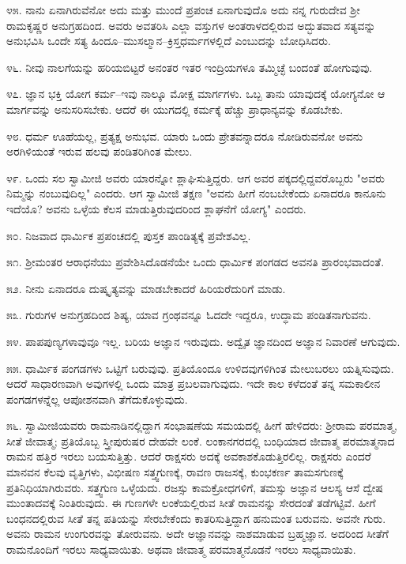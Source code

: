೪೫. ನಾನು ಏನಾಗಿರುವೆನೋ ಅದು ಮತ್ತು ಮುಂದೆ ಪ್ರಪಂಚ ಏನಾಗುವುದೊ ಅದು ನನ್ನ ಗುರುದೇವ ಶ‍್ರೀ ರಾಮಕೃಷ್ಣರ ಅನುಗ್ರಹದಿಂದ. ಅವರು ಅವತರಿಸಿ ಎಲ್ಲಾ ವಸ್ತುಗಳ ಅಂತರಾಳದಲ್ಲಿರುವ ಅದ್ಭುತವಾದ ಸತ್ಯವನ್ನು ಅನುಭವಿಸಿ ಒಂದೇ ಸತ್ಯ ಹಿಂದೂ–ಮುಸಲ್ಮಾನ–ಕ್ರಿಸ್ತಧರ್ಮಗಳಲ್ಲಿದೆ ಎಂಬುದನ್ನು ಬೋಧಿಸಿದರು.

೪೬. ನೀವು ನಾಲಗೆಯನ್ನು ಹರಿಯಬಿಟ್ಟರೆ ಅನಂತರ ಇತರ ಇಂದ್ರಿಯಗಳೂ ತಮ್ಮಿಚ್ಛೆ ಬಂದಂತೆ ಹೋಗುವುವು.

೪೭. ಜ್ಞಾನ ಭಕ್ತಿ ಯೋಗ ಕರ್ಮ–ಇವು ನಾಲ್ಕೂ ಮೋಕ್ಷ ಮಾರ್ಗಗಳು. ಒಬ್ಬ ತಾನು ಯಾವುದಕ್ಕೆ ಯೋಗ್ಯನೋ ಆ ಮಾರ್ಗವನ್ನು ಅನುಸರಿಸಬೇಕು. ಆದರೆ ಈ ಯುಗದಲ್ಲಿ ಕರ್ಮಕ್ಕೆ ಹೆಚ್ಚು ಪ್ರಾಧಾನ್ಯವನ್ನು ಕೊಡಬೇಕು.

೪೮. ಧರ್ಮ ಊಹೆಯಲ್ಲ, ಪ್ರತ್ಯಕ್ಷ ಅನುಭವ. ಯಾರು ಒಂದು ಪ್ರೇತವನ್ನಾದರೂ ನೋಡಿರುವನೋ ಅವನು ಅರಗಿಳಿಯಂತೆ ಇರುವ ಹಲವು ಪಂಡಿತರಿಗಿಂತ ಮೇಲು.

೪೯. ಒಂದು ಸಲ ಸ್ವಾಮೀಜಿ ಅವರು ಯಾರನ್ನೋ ಶ್ಲಾಘಿಸುತ್ತಿದ್ದರು. ಆಗ ಅವರ ಪಕ್ಕದಲ್ಲಿದ್ದವರೊಬ್ಬರು "ಅವರು ನಿಮ್ಮನ್ನು ನಂಬುವುದಿಲ್ಲ" ಎಂದರು. ಆಗ ಸ್ವಾಮೀಜಿ ತಕ್ಷಣ "ಅವನು ಹೀಗೆ ನಂಬಬೇಕೆಂದು ಏನಾದರೂ ಕಾನೂನು ಇದೆಯೊ? ಅವನು ಒಳ್ಳೆಯ ಕೆಲಸ ಮಾಡುತ್ತಿರುವುದರಿಂದ ಶ್ಲಾಘನೆಗೆ ಯೋಗ್ಯ" ಎಂದರು.

೫೦. ನಿಜವಾದ ಧಾರ್ಮಿಕ ಪ್ರಪಂಚದಲ್ಲಿ ಪುಸ್ತಕ ಪಾಂಡಿತ್ಯಕ್ಕೆ ಪ್ರವೇಶವಿಲ್ಲ.

೫೧. ಶ‍್ರೀಮಂತರ ಆರಾಧನೆಯು ಪ್ರವೇಶಿಸಿದೊಡನೆಯೇ ಒಂದು ಧಾರ್ಮಿಕ ಪಂಗಡದ ಅವನತಿ ಪ್ರಾರಂಭವಾದಂತೆ.

೫೨. ನೀನು ಏನಾದರೂ ದುಷ್ಕೃತ್ಯವನ್ನು ಮಾಡಬೇಕಾದರೆ ಹಿರಿಯರೆದುರಿಗೆ ಮಾಡು.

೫೩. ಗುರುಗಳ ಅನುಗ್ರಹದಿಂದ ಶಿಷ್ಯ, ಯಾವ ಗ್ರಂಥವನ್ನೂ ಓದದೇ ಇದ್ದರೂ, ಉದ್ಧಾಮ ಪಂಡಿತನಾಗುವನು.

೫೪. ಪಾಪಪುಣ್ಯಗಳಾವುವೂ ಇಲ್ಲ. ಬರಿಯ ಅಜ್ಞಾನ ಇರುವುದು. ಅದ್ವೈತ ಜ್ಞಾನದಿಂದ ಅಜ್ಞಾನ ನಿವಾರಣೆ ಆಗುವುದು.

೫೫. ಧಾರ್ಮಿಕ ಪಂಗಡಗಳು ಒಟ್ಟಿಗೆ ಬರುವುವು. ಪ್ರತಿಯೊಂದೂ ಉಳಿದವುಗಳಿಗಿಂತ ಮೇಲುಬರಲು ಯತ್ನಿಸುವುದು. ಆದರೆ ಸಾಧಾರಣವಾಗಿ ಅವುಗಳಲ್ಲಿ ಒಂದು ಮಾತ್ರ ಪ್ರಬಲವಾಗುವುದು. ಇದೇ ಕಾಲ ಕಳೆದಂತೆ ತನ್ನ ಸಮಕಾಲೀನ ಪಂಗಡಗಳನ್ನೆಲ್ಲ ಆಪೋಶನವಾಗಿ ತೆಗೆದುಕೊಳ್ಳುವುದು.

೫೬. ಸ್ವಾಮೀಜಿಯವರು ರಾಮನಾಡಿನಲ್ಲಿದ್ದಾಗ ಸಂಭಾಷಣೆಯ ಸಮಯದಲ್ಲಿ ಹೀಗೆ ಹೇಳಿದರು: ಶ‍್ರೀರಾಮ ಪರಮಾತ್ಮ, ಸೀತೆ ಜೀವಾತ್ಮ; ಪ್ರತಿಯೊಬ್ಬ ಸ್ತ್ರೀಪುರುಷರ ದೇಹವೇ ಲಂಕೆ. ಲಂಕಾನಗರದಲ್ಲಿ ಬಂಧಿಯಾದ ಜೀವಾತ್ಮ ಪರಮಾತ್ಮನಾದ ರಾಮನ ಹತ್ತಿರ ಇರಲು ಬಯಸುತ್ತಿತ್ತು. ಆದರೆ ರಾಕ್ಷಸರು ಅದಕ್ಕೆ ಅವಕಾಶಕೊಡುತ್ತಿರಲಿಲ್ಲ. ರಾಕ್ಷಸರು ಎಂದರೆ ಮಾನವನ ಕೆಲವು ವೃತ್ತಿಗಳು, ವಿಭೀಷಣ ಸತ್ತ್ವಗುಣಕ್ಕೆ, ರಾವಣ ರಾಜಸಕ್ಕೆ, ಕುಂಭಕರ್ಣ ತಾಮಸಗುಣಕ್ಕೆ ಪ್ರತಿನಿಧಿಯಾಗಿರುವರು. ಸತ್ತ್ವಗುಣ ಒಳ್ಳೆಯದು. ರಜಸ್ಸು ಕಾಮಕ್ರೋಧಗಳಿಗೆ, ತಮಸ್ಸು ಅಜ್ಞಾನ ಆಲಸ್ಯ ಆಸೆ ದ್ವೇಷ ಮುಂತಾದವಕ್ಕೆ ನಿಂತಿರುವುದು. ಈ ಗುಣಗಳೇ ಲಂಕೆಯಲ್ಲಿರುವ ಸೀತೆ ರಾಮನನ್ನು ಸೇರದಂತೆ ತಡೆಗಟ್ಟಿವೆ. ಹೀಗೆ ಬಂಧನದಲ್ಲಿರುವ ಸೀತೆ ತನ್ನ ಪತಿಯನ್ನು ಸೇರಬೇಕೆಂದು ಕಾತರಿಸುತ್ತಿದ್ದಾಗ ಹನುಮಂತ ಬರುವನು. ಅವನೇ ಗುರು. ಅವನು ರಾಮನ ಉಂಗುರವನ್ನು ತೋರುವನು. ಅದೇ ಅಜ್ಞಾನವನ್ನು ನಾಶಮಾಡುವ ಬ್ರಹ್ಮಜ್ಞಾನ. ಅದರಿಂದ ಸೀತೆಗೆ ರಾಮನೊಂದಿಗೆ ಇರಲು ಸಾಧ್ಯವಾಯಿತು. ಅಥವಾ ಜೀವಾತ್ಮ ಪರಮಾತ್ಮನೊಡನೆ ಇರಲು ಸಾಧ್ಯವಾಯಿತು.

